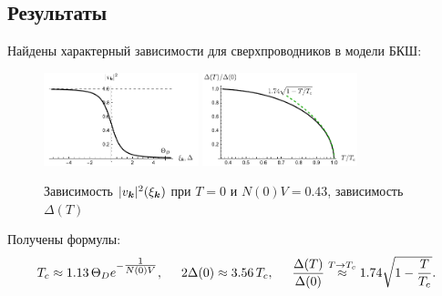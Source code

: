\subsection*{Результаты}


Найдены характерный зависимости для сверхпроводников в модели БКШ:

\begin{figure}[h]
    \centering
    \includegraphics[width=0.4\textwidth]{plot_1.pdf}
    \hspace{10 mm} 
    \includegraphics[width=0.4\textwidth]{plot_2.pdf}
    \caption{Зависимость $|v_{{\boldsymbol{k}}}|^2(\xi_{{\boldsymbol{k}}})$ при $T=0$ и $N(0) V = 0.43$, зависимость $\Delta(T)$}
    \label{fig:1}
\end{figure}


Получены формулы:
\begin{equation*}
    T_c  \approx 1.13\, \Theta_D e^{-\tfrac{1}{N(0) V}},
    \hspace{5 mm} 
    2 \Delta(0) \approx 3.56\, T_c,
    \hspace{5 mm} 
    \frac{\Delta(T)}{\Delta(0)} \overset{T \to T_c}{\approx}  1.74 \sqrt{1 - \frac{T}{T_c}}.
\end{equation*}


\hspace{20mm}

\phantom{42}